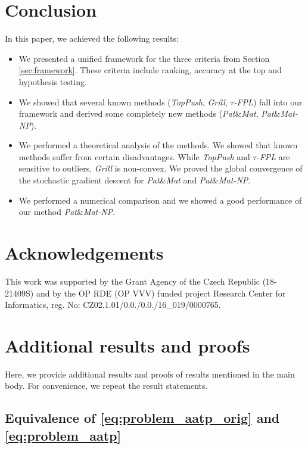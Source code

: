 \documentclass[]{interact}
\theoremstyle{plain}%
\theoremstyle{definition}
\theoremstyle{remark}
\newcommand{\toppush}{\emph{TopPush}\xspace}
\newcommand{\toppushk}{\emph{TopPushK}\xspace}
\newcommand{\grill}{\emph{Grill}\xspace}
\newcommand{\patmat}{\emph{Pat}\&\emph{Mat}\xspace}
\newcommand{\npB}{{\emph{Pat}\&\emph{Mat-NP}}\xspace}
\newcommand{\npC}{{\emph{$\tau$-FPL}}\xspace}
\newcommand{\NEW}[1]{{\color{blue} #1}}
\begin{document}
\section{Conclusion}

In this paper, we achieved the following results:
\begin{itemize}\itemsep 0pt
\item We presented a unified framework for the three criteria from Section \ref{sec:framework}. \NEW{These criteria include ranking, accuracy at the top and hypothesis testing.}
\item We showed that several known methods (\toppush, \grill, \npC) fall into our framework and derived some completely new methods (\patmat, \npB).
\item We performed a theoretical analysis of the methods. We showed that known methods suffer from certain disadvantages. While \toppush and \npC are sensitive to outliers, \grill is non-convex. We proved the global convergence of the stochastic gradient descent for \patmat and \npB.
\item We performed a numerical comparison and we showed a good performance of our method \npB.
\end{itemize}


\section*{Acknowledgements}


This work was supported by the Grant Agency of the Czech Republic (18-21409S) and by the OP RDE (OP VVV) funded project Research Center for Informatics, reg. No: CZ02.1.01/0.0./0.0./16\_019/0000765.


\appendix


\section{Additional results and proofs}\label{app:proofs}

Here, we provide additional results and proofs of results mentioned in the main body. For convenience, we repeat the result statements.

\subsection{Equivalence of \eqref{eq:problem_aatp_orig} and \eqref{eq:problem_aatp}}
\end{document}
